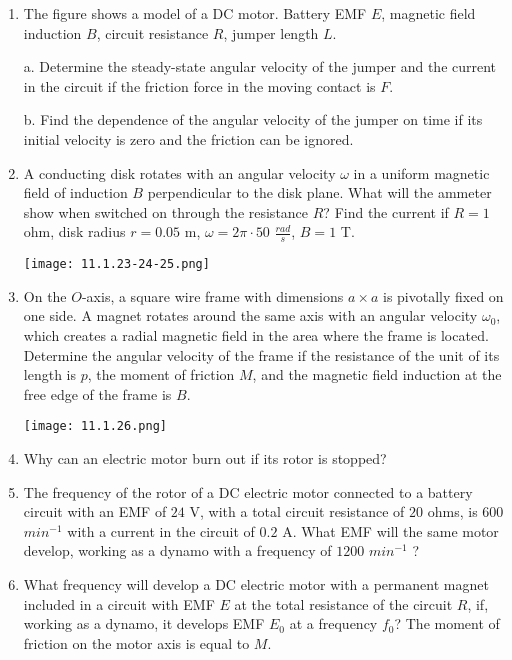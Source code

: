 \documentclass{article}
\begin{document}
\begin{enumerate}[label=11.1.\arabic*]
\item The figure shows a model of a DC motor. Battery EMF $E$, magnetic field induction $B$, circuit resistance $R$, jumper length $L$. 

a. Determine the steady-state angular velocity of the jumper and the current in the circuit if the friction force in the moving contact is $F$.

b. Find the dependence of the angular velocity of the jumper on time if its initial velocity is zero and the friction can be ignored.

\item A conducting disk rotates with an angular velocity $\omega$ in a uniform magnetic field of induction $B$ perpendicular to the disk plane. What will the ammeter show when switched on through the resistance $R$? Find the current if $R = 1$ ohm, disk radius $r = 0.05$ m, $\omega = 2 \pi \cdot 50$ $\frac{rad}{s}$, $B = 1$ T.

\begin{center}
    \texttt{[image: 11.1.23-24-25.png]}
\end{center}

\item On the $O$-axis, a square wire frame with dimensions $a \times a$ is pivotally fixed on one side. A magnet rotates around the same axis with an angular velocity $\omega_0$, which creates a radial magnetic field in the area where the frame is located. Determine the angular velocity of the frame if the resistance of the unit of its length is $p$, the moment of friction $M$, and the magnetic field induction at the free edge of the frame is $B$.

\begin{center}
    \texttt{[image: 11.1.26.png]}
\end{center}

\item Why can an electric motor burn out if its rotor is stopped?

\item The frequency of the rotor of a DC electric motor connected to a battery circuit with an EMF of $24$ V, with a total circuit resistance of $20$ ohms, is $600$ $min^{-1}$ with a current in the circuit of $0.2$ A. What EMF will the same motor develop, working as a dynamo with a frequency of $1200$ $min^{-1}$ ?

\item What frequency will develop a DC electric motor with a permanent magnet included in a circuit with EMF $E$ at the total resistance of the circuit $R$, if, working as a dynamo, it develops EMF $E_0$ at a frequency $f_0$? The moment of friction on the motor axis is equal to $M$.


\end{enumerate}
\end{document}
